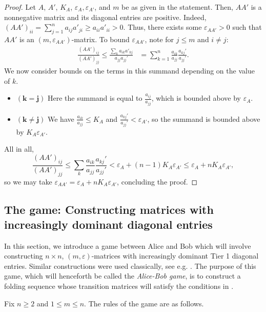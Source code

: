 \documentclass[11pt, letterpaper]{amsart}
\theoremstyle{plain}
\theoremstyle{definition}
\renewcommand{\epsilon}{\varepsilon}
\newcommand{\eps}{\epsilon}
\begin{document}
\begin{proof}
  Let $A$, $A'$, $K_A$, $\epsilon_A, \epsilon_{A'}$, and $m$ be as given in the statement. Then, $AA'$ is a nonnegative matrix and its diagonal entries are positive. Indeed, $(AA')_{ii}= \sum_{j=1}^n a_{ij}a'_{ji} \ge a_{ii}a'_{ii}>0$.  Thus, there exists some $\eps_{AA'}>0$ such that $AA'$ is an $(m, \eps_{AA'})$-matrix. 
  To bound $\eps_{AA'}$, note for $j \le m$ and $i \neq j$:
  \begin{align*}
    \frac{(AA')_{ij}}{(AA')_{jj}} \le \frac{\sum_{k}a_{ik}a'_{kj}}{a_{jj}a_{jj}'}
    &= \sum_{k=1}^n \frac{a_{ik}}{a_{jj}} \frac{a_{kj}'}{a_{jj}'}.
  \end{align*}
  We now consider bounds on the terms in this summand depending
  on the value of $k$.
  \begin{itemize}
  \item $\mathbf{(k=j)}$ Here the summand is equal to $\frac{a_{ij}}{a_{jj}}$, which is bounded above by $\eps_A$.
  \item $\mathbf{(k \neq j)}$ We have 
    $\frac{a_{ik}}{a_{jj}} \le K_A$ and $\frac{a_{kj}'}{a_{jj}'} < \eps_{A'}$, so
    the summand is bounded above by $K_A \eps_{A'}$.
  \end{itemize}
  All in all, 
  \[
    \frac{(AA')_{ij}}{(AA')_{jj}} \le \sum_{k} \frac{a_{ik}}{a_{jj}}
    \frac{a_{kj}'}{a_{jj}'} < \eps_A + (n-1)K_A\eps_{A'}\leq \eps_A + nK_A \eps_{A'},
  \]
  so we may take $\eps_{AA'} = \eps_A + nK_A\eps_{A'}$, concluding the proof.
\end{proof}

\subsection{The game: Constructing matrices with increasingly dominant
  diagonal entries}\label{ssec:thegame_folding}

In this section, we introduce a game between Alice and Bob which will involve
constructing $n\times n$, $(m, \epsilon)$-matrices with increasingly dominant
Tier 1 diagonal entries. Similar constructions were used classically,
see e.g. \cite{yoccoz2010interval}. The purpose of this game, which will henceforth be called the \emph{Alice-Bob game}, is to construct a folding sequence whose transition matrices will satisfy the conditions in . 

Fix $n\geq 2$ and $1\leq m\le n$. The rules of the game are as follows.
\end{document}
